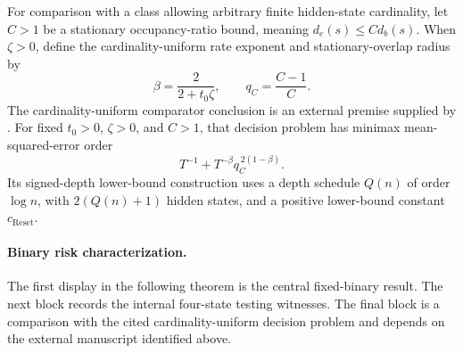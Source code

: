 \documentclass[11pt]{article}
\begin{document}
For comparison with a class allowing arbitrary finite hidden-state cardinality, let \(C>1\) be a stationary occupancy-ratio bound, meaning \(d_e(s)\leq C d_b(s)\). When \(\zeta>0\), define the cardinality-uniform rate exponent  and stationary-overlap radius  by
\[
\beta=\frac{2}{2+t_0\zeta},
\qquad
q_C=\frac{C-1}{C}.
\]
The cardinality-uniform comparator conclusion is an external premise supplied by \citet[Theorem 1 (Uniform overlap frontier) and the Signed-depth family definition]{CausalSmithLatentOverlap2026}. For fixed \(t_0>0\), \(\zeta>0\), and \(C>1\), that decision problem has minimax mean-squared-error order
\[
T^{-1}+T^{-\beta}q_C^{\,2(1-\beta)}.
\]
Its signed-depth lower-bound construction uses a depth schedule \(Q(n)\) of order \(\log n\), with \(2(Q(n)+1)\) hidden states, and a positive lower-bound constant \(c_{\mathrm{Reset}}\).

\paragraph{Binary risk characterization.}
The first display in the following theorem is the central fixed-binary result. The next block records the internal four-state testing witnesses. The final block is a comparison with the cited cardinality-uniform decision problem and depends on the external manuscript identified above.
\end{document}

